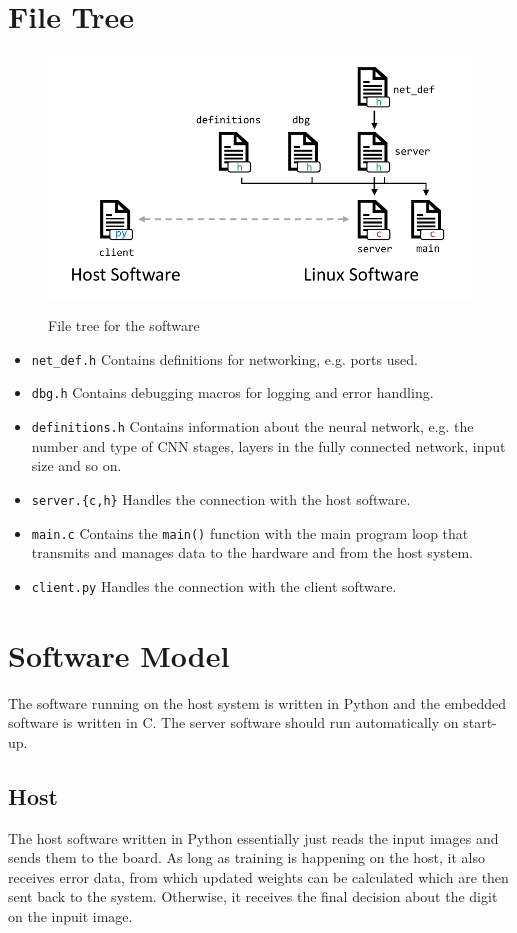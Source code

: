 \documentclass[12pt]{article}
\begin{document}
\section{File Tree}
\begin{figure}[h] 
	\centering
	{\includegraphics[scale=0.75]{img/software.pdf}} 
	\caption{File tree for the software}
\end{figure} 
\begin{itemize}
	\item \verb|net_def.h| Contains definitions for networking, e.g. ports used.
	\item \verb|dbg.h| Contains debugging macros for logging and error handling.
	\item \verb|definitions.h| Contains information about the neural network, e.g. the number and type of \ac{CNN} stages, layers in the fully connected network, input size and so on.
	\item \verb|server.{c,h}| Handles the connection with the host software.
	\item \verb|main.c| Contains the \verb|main()| function with the main program loop that transmits and manages data to the hardware and from the host system.
	\item \verb|client.py| Handles the connection with the client software.
\end{itemize}
\section{Software Model}
The software running on the host system is written in Python and the embedded software is written in C. The server software should run automatically on start-up.
\subsection{Host}
The host software written in Python essentially just reads the input images and sends them to the board. As long as training is happening on the host, it also receives error data, from which updated weights can be calculated which are then sent back to the system. Otherwise, it receives the final decision about the digit on the inpuit image.
\end{document}
